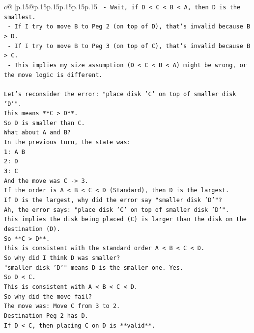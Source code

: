 \documentclass{article}
\begin{document}
{\begin{supertabular}{c@{$\;$}|p{.15\linewidth}@{}p{.15\linewidth}p{.15\linewidth}p{.15\linewidth}p{.15\linewidth}p{.15\linewidth}}
{{{\texttt{    {-} Wait, if D < C < B < A, then D is the smallest.} \\
\texttt{    {-} If I try to move B to Peg 2 (on top of D), that's invalid because B > D.} \\
\texttt{    {-} If I try to move B to Peg 3 (on top of C), that's invalid because B > C.} \\
\texttt{    {-} This implies my size assumption (D < C < B < A) might be wrong, or the move logic is different.} \\
\\ 
\texttt{Let's reconsider the error: "place disk 'C' on top of smaller disk 'D'".} \\
\texttt{This means **C > D**.} \\
\texttt{So D is smaller than C.} \\
\texttt{What about A and B?} \\
\texttt{In the previous turn, the state was:} \\
\texttt{1: A B} \\
\texttt{2: D} \\
\texttt{3: C} \\
\texttt{And the move was C {-}> 3.} \\
\texttt{If the order is A < B < C < D (Standard), then D is the largest.} \\
\texttt{If D is the largest, why did the error say "smaller disk 'D'"?} \\
\texttt{Ah, the error says: "place disk 'C' on top of smaller disk 'D'".} \\
\texttt{This implies the disk being placed (C) is larger than the disk on the destination (D).} \\
\texttt{So **C > D**.} \\
\texttt{This is consistent with the standard order A < B < C < D.} \\
\texttt{So why did I think D was smaller?} \\
\texttt{"smaller disk 'D'" means D is the smaller one. Yes.} \\
\texttt{So D < C.} \\
\texttt{This is consistent with A < B < C < D.} \\
\texttt{So why did the move fail?} \\
\texttt{The move was: Move C from 3 to 2.} \\
\texttt{Destination Peg 2 has D.} \\
\texttt{If D < C, then placing C on D is **valid**.} \\
}}}
\end{supertabular}}
\end{document}
